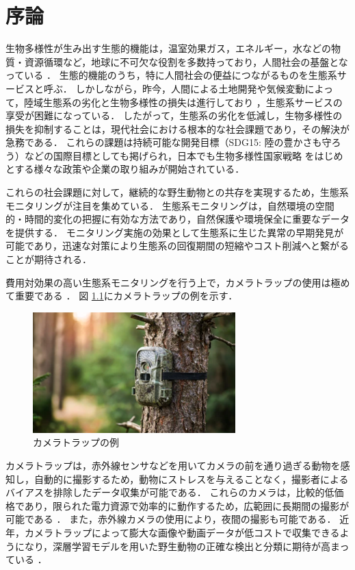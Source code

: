 
\chapter{序論}
\setcounter{page}{1}

生物多様性が生み出す生態的機能は，温室効果ガス，エネルギー，水などの物質・資源循環など，地球に不可欠な役割を多数持っており，人間社会の基盤となっている \cite{millennium-ecosystem2005,cardinale2011}．
生態的機能のうち，特に人間社会の便益につながるものを生態系サービスと呼ぶ．
しかしながら，昨今，人間による土地開発や気候変動によって，陸域生態系の劣化と生物多様性の損失は進行しており \cite{newbold2015,isbell2017}，生態系サービスの享受が困難になっている．
したがって，生態系の劣化を低減し，生物多様性の損失を抑制することは，現代社会における根本的な社会課題であり，その解決が急務である．
これらの課題は持続可能な開発目標（SDG15: 陸の豊かさも守ろう）などの国際目標としても掲げられ，日本でも生物多様性国家戦略 \cite{biodiversity2023}をはじめとする様々な政策や企業の取り組みが開始されている．

これらの社会課題に対して，継続的な野生動物との共存を実現するため，生態系モニタリングが注目を集めている．
生態系モニタリングは，自然環境の空間的・時間的変化の把握に有効な方法であり，自然保護や環境保全に重要なデータを提供する．
モニタリング実施の効果として生態系に生じた異常の早期発見が可能であり，迅速な対策により生態系の回復期間の短縮やコスト削減へと繋がることが期待される．

費用対効果の高い生態系モニタリングを行う上で，カメラトラップの使用は極めて重要である \cite{jia2022}．
図 \ref{fig:cameratrap}にカメラトラップの例を示す．
% 
\begin{figure}[tbp]
  \centering
  \includegraphics[width=0.5\linewidth, keepaspectratio]{image/cameratrap.png}
  \caption{カメラトラップの例}
  \label{fig:cameratrap}
\end{figure}
% 
カメラトラップは，赤外線センサなどを用いてカメラの前を通り過ぎる動物を感知し，自動的に撮影するため，動物にストレスを与えることなく，撮影者によるバイアスを排除したデータ収集が可能である\cite{newey2015,zhu2017}．
これらのカメラは，比較的低価格であり，限られた電力資源で効率的に動作するため，広範囲に長期間の撮影が可能である \cite{schneider2018, carl2020}．
また，赤外線カメラの使用により，夜間の撮影も可能である．
近年，カメラトラップによって膨大な画像や動画データが低コストで収集できるようになり，深層学習モデルを用いた野生動物の正確な検出と分類に期待が高まっている \cite{tan2022}．

